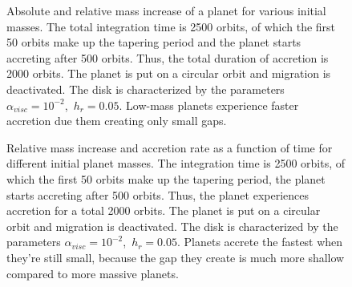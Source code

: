       \begin{figure}[h!]
        \centering
        \begin{minipage}{.5\linewidth}
          \centering
        \end{minipage}%
        \begin{minipage}{.5\linewidth}
          \centering
        \end{minipage}
        \caption{
          Absolute and relative mass increase of a planet for various 
          initial masses. The total integration time is 2500 orbits, of 
          which the first 50 orbits make up the tapering 
          period and the planet starts accreting 
          after 500 orbits. Thus, the total duration of accretion is
          2000 orbits. The planet is put on a circular orbit and migration is
          deactivated. The disk is characterized by the parameters 
          $\alpha_{visc}=10^{-2}$,\ $h_r=0.05$.
          Low-mass planets experience faster accretion due them creating only 
          small gaps.
        }
        \label{fig:accretion_vs_m0}
      \end{figure} 

      \begin{figure}[h!]
        \centering
        \begin{minipage}{.5\linewidth}
          \centering
        \end{minipage}%
        \begin{minipage}{.5\linewidth}
          \centering
        \end{minipage}
        \caption{
          Relative mass increase and accretion rate as a function of time for
          different initial planet masses. The integration time is
          2500 orbits, of which the first 50 orbits make up the tapering 
          period, the planet starts accreting 
          after 500 orbits. Thus, the planet experiences accretion for a total 
          2000 orbits. The planet is put on a circular orbit and migration is
          deactivated. The disk is characterized by the parameters 
          $\alpha_{visc}=10^{-2}$,\ $h_r=0.05$.
          Planets accrete the fastest when they're still small, because the 
          gap they create is much more shallow compared to more massive planets.
        }
        \label{fig:accretion_vs_t_and_m0}
      \end{figure} 

